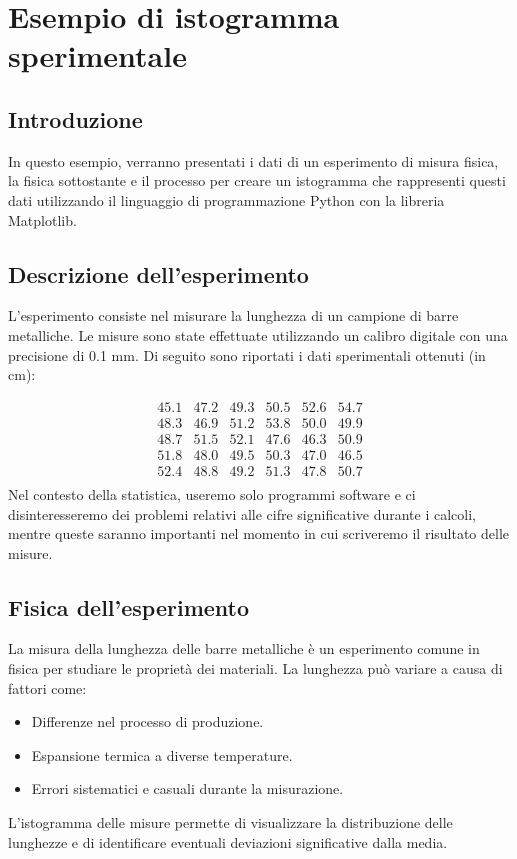 \section{Esempio di istogramma sperimentale}

\subsection{Introduzione}
In questo esempio, verranno presentati i dati di un esperimento di misura fisica, la fisica sottostante e il processo per creare un istogramma che rappresenti questi dati utilizzando il linguaggio di programmazione Python con la libreria Matplotlib.

\subsection{Descrizione dell'esperimento}
L'esperimento consiste nel misurare la lunghezza di un campione di barre metalliche. Le misure sono state effettuate utilizzando un calibro digitale con una precisione di 0.1 mm. Di seguito sono riportati i dati sperimentali ottenuti (in cm):

\[
\begin{array}{cccccc}
45.1 & 47.2 & 49.3 & 50.5 & 52.6 & 54.7 \\
48.3 & 46.9 & 51.2 & 53.8 & 50.0 & 49.9 \\
48.7 & 51.5 & 52.1 & 47.6 & 46.3 & 50.9 \\
51.8 & 48.0 & 49.5 & 50.3 & 47.0 & 46.5 \\
52.4 & 48.8 & 49.2 & 51.3 & 47.8 & 50.7 \\
\end{array}
\]
Nel contesto della statistica, useremo solo programmi software e ci disinteresseremo dei problemi relativi alle cifre significative durante i calcoli, mentre queste saranno importanti nel momento in cui scriveremo il risultato delle misure.
\subsection{Fisica dell'esperimento}
La misura della lunghezza delle barre metalliche è un esperimento comune in fisica per studiare le proprietà dei materiali. La lunghezza può variare a causa di fattori come:
\begin{itemize}
    \item Differenze nel processo di produzione.
    \item Espansione termica a diverse temperature.
    \item Errori sistematici e casuali durante la misurazione.
\end{itemize}
L'istogramma delle misure permette di visualizzare la distribuzione delle lunghezze e di identificare eventuali deviazioni significative dalla media.

